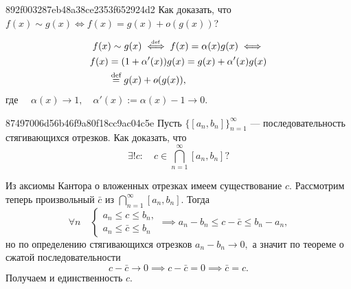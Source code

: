     \begin{note}{892f003287eb48a38ce2353f652924d2}
        Как доказать, что \( f(x) \sim g(x) \iff f(x) = g(x) + o(g(x)) \)?

        \begin{cloze}{1}
            \begin{multline*}
                f(x) \sim g(x) \overset{\hspace{-1pt}\text{\tiny def}}\iff f(x) = \alpha(x) g(x) \iff \\
                \begin{aligned}
                    f(x) &= (1 + \alpha'(x)) g(x) = g(x) + \alpha'(x)g(x) \\
                    &\overset{\text{def}}= g(x) + o(g(x)),
                \end{aligned}
            \end{multline*}
            где \( \quad \alpha(x) \to 1, \quad \alpha'(x) := \alpha(x) - 1 \to 0. \)
        \end{cloze}
    \end{note}

    \begin{note}{87497006d56b46f9a80f18cc9ac04c5e}
        Пусть \( \{ [a_n, b_n] \}_{n = 1}^{\infty } \) --- последовательность стягивающихся отрезков. Как доказать, что \[
            \exists! c : \quad c \in \bigcap _{n = 1} ^{\infty } [a_n, b_n]?
        \]

        \begin{cloze}{1}
            Из аксиомы Кантора о вложенных отрезках имеем существование \( c. \)
            Рассмотрим теперь произвольный \( \bar{c} \) из \( \bigcap_{n = 1}^{\infty } [a_n, b_n]. \) Тогда
            \[
                \forall n \quad \begin{cases}
                    a_n \leqslant c \leqslant b_n, \\
                    a_n \leqslant \bar{c} \leqslant b_n
                \end{cases}
                \implies a_n - b_n \leqslant c - \bar{c} \leqslant b_n - a_n,
            \]
            но по определению стягивающихся отрезков \( a_n - b_n \to 0,  \) а значит по теореме о сжатой последовательности
            \[
                c - \bar{c} \to 0 \implies c - \bar{c} = 0 \implies \bar{c} = c.
            \]
            Получаем и единственность \( c. \)
        \end{cloze}
    \end{note}

